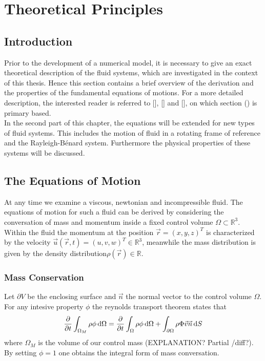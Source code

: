 \chapter{Theoretical Principles}

\section{Introduction}

Prior to the development of a numerical model, it is necessary to give an exact theoretical description of the
fluid systems, which are investigated in the context of this thesis.
Hence this section contains a brief overview of the derivation and the properties of the fundamental equations of motions.
For a more detailed description, the interested reader is referred to [], [] and [], on which section () is primary based.\\
In the second part of this chapter, the equations will be extended for new types of fluid systems.
This includes the motion of fluid in a rotating frame of reference and the Rayleigh-B\'{e}nard system.
Furthermore the physical properties of these systems will be discussed.

\section{The Equations of Motion}

At any time we examine a viscous, newtonian and incompressible fluid. The equations of motion for such a fluid can be derived by considering the conversation of
mass and momentum inside a fixed control volume $\Omega \subset \mathbb{R}^3$.
Within the fluid the momentum at the position $\vec{r} = (x, y, z)^T$  is  characterized by the velocity $\vec{u}(\vec{r}, t) = (u, v, w)^T \in \mathbb{R}^3$,
meanwhile the mass distribution is given by the density distribution$\rho(\vec{r}) \in \mathbb{R}$.

\subsection{Mass Conservation}

Let $\partial V$ be the enclosing surface and $\vec{n}$ the normal vector to the control volume $\Omega$.
For any intesive property $\phi$ the reynolds transport theorem states that
\begin{align}
    \pdn[]{t} \int_{\Omega_M} \rho \phi \dif \Omega = \pdn[]{t}\int_{\Omega} \rho \phi \dif \Omega + \int_{\partial\Omega} \rho \Phi \vec{v} \vec{n} \dif S
\end{align}
where $\Omega_M$ is the volume of our control mass (EXPLANATION? Partial /diff?).
By setting $\phi = 1$ one obtains the integral form of mass conversation.

